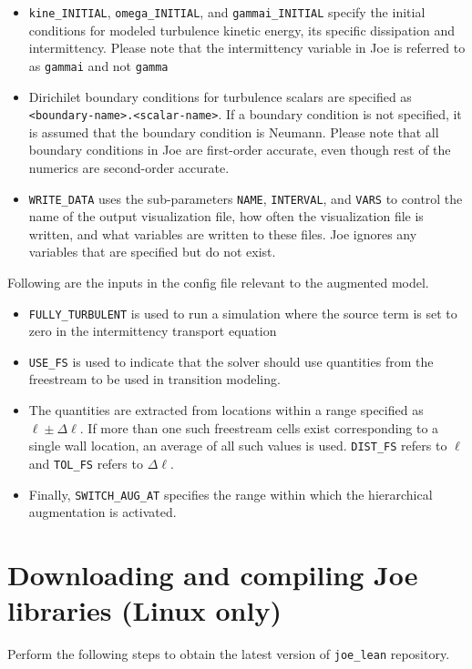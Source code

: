 \documentclass{article}
\begin{document}
\begin{itemize}
    \item \texttt{kine\_INITIAL}, \texttt{omega\_INITIAL}, and \texttt{gammai\_INITIAL} specify the initial conditions for modeled turbulence kinetic energy, its specific dissipation and intermittency. {\color[rgb]{0.7,0,0} Please note that the intermittency variable in Joe is referred to as \texttt{gammai} and not \texttt{gamma}}
    \item Dirichilet boundary conditions for turbulence scalars are specified as \texttt{<boundary-name>.<scalar-name>}. {\color[rgb]{0.7,0,0} If a boundary condition is not specified, it is assumed that the boundary condition is Neumann. Please note that all boundary conditions in Joe are first-order accurate, even though rest of the numerics are second-order accurate.}
    \item \texttt{WRITE\_DATA} uses the sub-parameters \texttt{NAME}, \texttt{INTERVAL}, and \texttt{VARS} to control the name of the output visualization file, how often the visualization file is written, and what variables are written to these files. Joe ignores any variables that are specified but do not exist.
\end{itemize}
Following are the inputs in the config file relevant to the augmented model.
\begin{itemize}
    \item \texttt{FULLY\_TURBULENT} is used to run a simulation where the source term is set to zero in the intermittency transport equation
    \item \texttt{USE\_FS} is used to indicate that the solver should use quantities from the freestream to be used in transition modeling.
    \item The quantities are extracted from locations within a range specified as $\ell\pm\Delta\ell$. If more than one such freestream cells exist corresponding to a single wall location, an average of all such values is used. \texttt{DIST\_FS} refers to $\ell$ and \texttt{TOL\_FS} refers to $\Delta\ell$.
    \item Finally, \texttt{SWITCH\_AUG\_AT} specifies the range within which the hierarchical augmentation is activated.
\end{itemize}

\section{Downloading and compiling Joe libraries (Linux only)}
Perform the following steps to obtain the latest version of \texttt{joe\_lean} repository.\\
\end{document}
